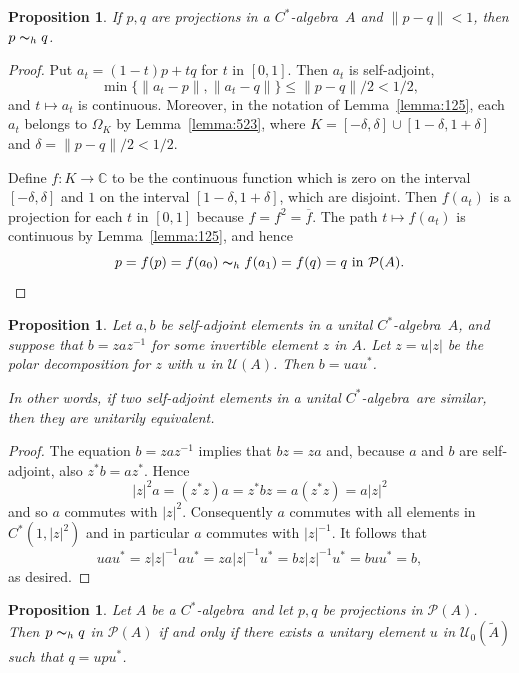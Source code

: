 \documentclass{book}
\newtheorem{proposition}[definition]{Proposition}
\def\cstar{\(C^*\)-algebra}
\begin{document}
\begin{proposition}\label{prop:Lars224}
  If \(p, q\) are projections in a \cstar\ \(A\) and \(\|p-q\|<1\), then \(p\thicksim_h q\).
\end{proposition}
\begin{proof}
  Put \(a_t=(1-t)p+tq\) for \(t\) in \([0,1]\). Then \(a_t\) is self-adjoint,
  \[
    \min\{\|a_t-p\|,\|a_t-q\|\}\leq\|p-q\|/2<1/2,
  \]
  and \(t\mapsto a_t\) is continuous. Moreover, in the notation of Lemma~\ref{lemma:125}, 
  each \(a_t\) belongs to \(\Omega_K\) by Lemma~\ref{lemma:523}, 
  where \(K=[-\delta,\delta]\cup[1-\delta,1+\delta]\) and \(\delta=\|p-q\|/2<1/2\).\par
  Define \(f:K\rightarrow\mathbb{C}\) to be the continuous function which is zero on the 
  interval \([-\delta,\delta]\) and \(1\) on the interval \([1-\delta,1+\delta]\), which are disjoint.
  Then \(f(a_t)\) is a projection for each \(t\) in \([0,1]\) because \(f=f^2=\overline{f}\). 
  The path \(t\mapsto f(a_t)\) is continuous by Lemma~\ref{lemma:125}, and hence
  \[
    p=f(p)=f(a_0)\thicksim_h f(a_1)=f(q)=q\mbox{ in }\mathcal{P}(A).
  \]
\end{proof}
\begin{proposition}\label{prop:525}
  Let \(a, b\) be self-adjoint elements in a unital \cstar\ \(A\), and suppose that \(b=za z^{-1}\) for some invertible
  element \(z\) in \(A\). Let \(z=u|z|\) be the polar decomposition for \(z\) with \(u\) in \(\mathcal{U}(A)\).
  Then \(b=uau^*\).\par
  In other words, if two self-adjoint elements in a unital \cstar\ are similar, then they are unitarily equivalent. 
\end{proposition}
\begin{proof}
  The equation \(b=zaz^{-1}\) implies that \(bz=za\) and, because \(a\) and \(b\) are self-adjoint,
  also \(z^*b=az^*\). Hence
  \[
    |z|^2a=(z^*z)a=z^*bz=a(z^*z)=a|z|^2
  \]
  and so \(a\) commutes with \(|z|^2\). Consequently \(a\) commutes with all elements in \(C^*(1,|z|^2)\)
  and in particular \(a\) commutes with \(|z|^{-1}\). It follows that
  \[
    uau^*=z|z|^{-1}au^*=za|z|^{-1}u^*=bz|z|^{-1}u^*=buu^*=b,
  \]
  as desired.
\end{proof}
\begin{proposition}\label{prop:526}
  Let \(A\) be a \cstar\, and let \(p, q\) be projections in \(\mathcal{P}(A)\).
  Then \(p\thicksim_h q\) in \(\mathcal{P}(A)\) if and only if there exists a unitary element \(u\) in \(\mathcal{U}_0(\widetilde{A})\) such that \(q=upu^*\).
\end{proposition}
\end{document}
